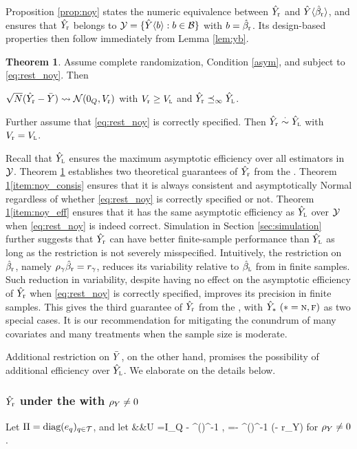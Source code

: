 \documentclass[11pt]{article}
\theoremstyle{definition}
\newtheorem{theorem}{Theorem}
\begin{document}
Proposition \ref{prop:noy} states the numeric equivalence between $\hat Y_{\textup{r}}$ and $\hat Y\langle \hat\beta_{\textup{r}}\rangle $, and ensures that $\hat Y_{\textup{r}}$ belongs to $\mathcal{Y} = \{\hat Y\langle b \rangle: b\in\mathcal{B}\}$ with $b = \hat\beta_{\textup{r}}$. Its design-based properties then follow immediately from Lemma \ref{lem:yb}.  

\begin{theorem}\label{thm:noy}
Assume complete randomization, Condition \ref{asym}, and \rlss subject to \eqref{eq:rest_noy}. Then 
\begine[(i)]
\item\label{item:noy_consis} $\sqrt N (\hat Y_{\textup{r}}  - \bar Y )  \rightsquigarrow \mathcal{N}(0_Q, V_{\textup{r}})$
with $V_{\textup{r}} \geq V_{\textsc{l}}$ and $\hat Y_{\textup{r}} \preceq_\infty \hat Y_{\textsc{l}}$. 
\item\label{item:noy_eff}
Further assume that \eqref{eq:rest_noy} is correctly specified. 
Then $\hat Y_{\textup{r}}  \overset{\cdot}{\sim} \hat Y_{\textsc{l}}$ with $V_{\textup{r}} = V_{\textsc{l}}$. 
\ende
\end{theorem}


Recall that $\hat Y_{\textsc{l}}$ ensures the maximum asymptotic efficiency over all estimators in $\mathcal{Y}$. 
Theorem \ref{thm:noy} establishes two theoretical guarantees of $\hat Y_{\textup{r}}$ from the {\gor}.
Theorem \ref{thm:noy}\eqref{item:noy_consis} ensures that it is always consistent and asymptotically Normal regardless of whether \eqref{eq:rest_noy} is correctly specified or not.
Theorem \ref{thm:noy}\eqref{item:noy_eff} ensures that it has the same asymptotic efficiency as $\hat Y_{\textsc{l}}$ over $\mathcal{Y}$ when \eqref{eq:rest_noy} is  indeed correct.
%
Simulation in Section \ref{sec:simulation} further suggests that $\hat Y_{\textup{r}} $ can have better finite-sample performance than $\hat Y_{\textsc{l}}$ as long as the restriction is not severely misspecified. 
Intuitively, the restriction on $\hat\beta_{\textup{r}}$, namely $\rho_\gamma \hat\beta_{\textup{r}} = r_\gamma$, reduces its variability relative to $\hat\beta_{\textsc{l}}$  from \olss in finite samples.
Such reduction in variability, despite having no effect on the asymptotic efficiency of $\hat Y_{\textup{r}}$ when \eqref{eq:rest_noy} is correctly specified, %
improves its precision in finite samples.
This gives the third guarantee of $\hat Y_{\textup{r}}$  from the {\gor},   with $\hat Y_*\ (* = \textsc{n}, \textsc{f})$ as two special cases. 
It is our recommendation for mitigating the conundrum of many covariates and many treatments when the sample size is moderate.  


Additional restriction on $\bar Y$, on the other hand, promises the possibility of additional efficiency over $\hat Y_{\textsc{l}}$.
We elaborate on the details below. 
%


\subsubsection{$\hat Y_{\textup{r}} $ under the {\sr} with $\rho_Y \neq 0$}\label{sec:sep}
Let $\Pi = \text{diag}(e_q)_{q\in\mathcal{T}}$, and let %
\beginy\label{eq:umu}
&&U =I_Q - \einv \rhy^\T   (\rhy \einv \rhyt)^{-1} \rhy, \quad
\mur =- \einv \rhy^\T   (\rhy \einv \rhyt)^{-1} (\rhy\by - r_Y)
\endy
for $\rho_Y \neq 0$. 
\end{document}
